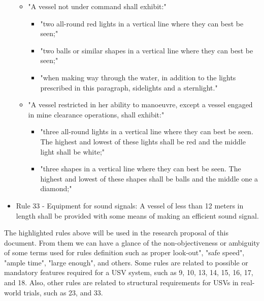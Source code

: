 \begin{itemize}
        \begin{itemize}

            \item "A vessel not under command shall exhibit:" 
                \begin{itemize}
            
                    \item "two all-round red lights in a vertical line where they can best be seen;" 
                    \item "two balls or similar shapes in a vertical line where they can best be seen;"
                    \item "when making way through the water, in addition to the lights prescribed in this paragraph, sidelights and a sternlight."
            
                \end{itemize}
            \item "A vessel restricted in her ability to manoeuvre, except a vessel engaged in mine clearance operations, shall exhibit:"
                \begin{itemize}
        
                \item "three all-round lights in a vertical line where they can best be seen. The highest and lowest of these lights shall be red and the middle light shall be white;"
                \item "three shapes in a vertical line where they can best be seen. The highest and lowest of these shapes shall be balls and the middle one a diamond;"
        
            \end{itemize}
        \end{itemize}
        
        \item Rule 33 - Equipment for sound signals: A vessel of less than 12 meters in length shall be provided with some means of making an efficient sound signal.

    \end{itemize}
    
    The highlighted rules above will be used in the research proposal of this document. 
    From them we can have a glance of the non-objectiveness or ambiguity of some terms used for rules definition such as proper look-out", "safe speed", "ample time", "large enough", and others. Some rules are related to possible or mandatory features required for a \ac{USV} system, such as 9, 10, 13, 14, 15, 16, 17, and 18. Also, other rules are related to structural requirements for \ac{USV}s in real-world trials, such as 23, and 33.
    
